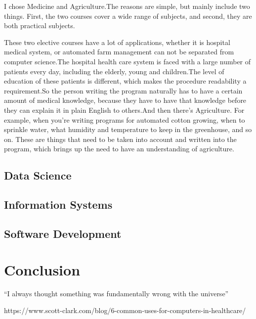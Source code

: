 \documentclass{article}
\begin{document}
  I chose Medicine and Agriculture.The reasons are simple, but mainly include two things.
First, the two courses cover a wide range of subjects, and second, they are both practical
subjects.

These two elective courses have a lot of applications, whether it is hospital medical system,
or automated farm management can not be separated from computer science.The hospital health care
system is faced with a large number of patients every day, including the elderly, young and
children.The level of education of these patients is different, which makes the procedure readability
a requirement.So the person writing the program naturally has to have a certain amount of medical
knowledge, because they have to have that knowledge before they can explain it in plain English to
others.And then there's Agriculture. For example, when you're writing programs for automated cotton
growing, when to sprinkle water, what humidity and temperature to keep in the greenhouse, and so on.
These are things that need to be taken into account and written into the program, which brings up
the need to have an understanding of agriculture.


\subsection{Data Science}


\subsection{Information Systems}


\subsection{Software Development}

\section{Conclusion}
``I always thought something was fundamentally wrong with the universe'' \citep{adams1995hitchhiker}




https://www.scott-clark.com/blog/6-common-uses-for-computers-in-healthcare/
\end{document}
